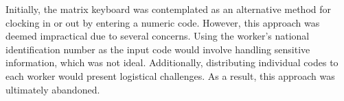 Initially, the matrix keyboard was contemplated as an alternative method for clocking in or out by entering a numeric 
code. However, this approach was deemed impractical due to several concerns. Using the worker's national identification 
number as the input code would involve handling sensitive information, which was not ideal. Additionally, distributing 
individual codes to each worker would present logistical challenges. As a result, this approach was ultimately abandoned.





